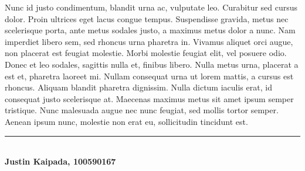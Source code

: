 \documentclass[10pt,landscape]{article}
\begin{document}
\begin{multicols}{3}
Nunc id justo condimentum, blandit urna ac, vulputate leo. Curabitur
sed cursus dolor. Proin ultrices eget lacus congue tempus. Suspendisse
gravida, metus nec scelerisque porta, ante metus sodales justo, a
maximus metus dolor a nunc. Nam imperdiet libero sem, sed rhoncus urna
pharetra in. Vivamus aliquet orci augue, non placerat est feugiat
molestie. Morbi molestie feugiat elit, vel posuere odio. Donec et leo
sodales, sagittis nulla et, finibus libero. Nulla metus urna, placerat
a est et, pharetra laoreet mi. Nullam consequat urna ut lorem mattis,
a cursus est rhoncus. Aliquam blandit pharetra dignissim. Nulla dictum
iaculis erat, id consequat justo scelerisque at. Maecenas maximus
metus sit amet ipsum semper tristique. Nunc malesuada augue nec nunc
feugiat, sed mollis tortor semper. Aenean ipsum nunc, molestie non
erat eu, sollicitudin tincidunt est.
~\\

\vfill
\hrule
~\\
\textbf{Justin Kaipada, 100590167}
\end{multicols}
\end{document}
